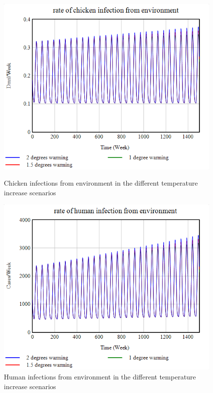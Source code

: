 \begin{figure}[h!]
    \centering
    \begin{minipage}{0.45\textwidth}
        \centering
        \includegraphics[width=1\textwidth]{images/sensitivity/Temperature projection chicken infection.png} 
        \caption{Chicken infections from environment in the different temperature increase scenarios}
        \label{fig:temp_chicken}
    \end{minipage}\hfill
    \begin{minipage}{0.45\textwidth}
        \centering
        \includegraphics[width=1\textwidth]{images/sensitivity/Temperature projection human infection.png}
        \caption{Human infections from environment in the different temperature increase scenarios}
        \label{fig:temp_human}
    \end{minipage}
\end{figure}

